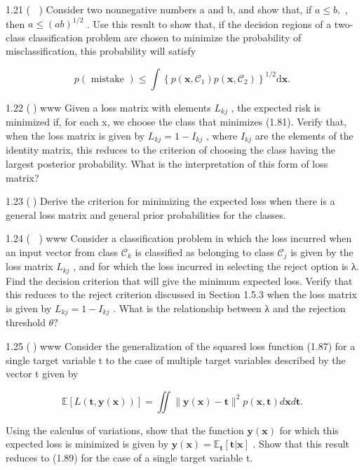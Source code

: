 \documentclass[
  10
]{article}
\begin{document}
1.21 ( ) Consider two nonnegative numbers a and b, and show that, if
\(a \leqslant b ,\) , then \(a \leqslant ( a b ) ^ { 1 / 2 }\) . Use
this result to show that, if the decision regions of a two-class
classification problem are chosen to minimize the probability of
misclassification, this probability will satisfy

\[
p (\text { mistake }) \leqslant \int \left\{p (\mathbf {x}, \mathcal {C} _ {1}) p (\mathbf {x}, \mathcal {C} _ {2}) \right\} ^ {1 / 2} \mathrm{d} \mathbf {x}.\tag{1.150}
\]

1.22 () www Given a loss matrix with elements \(L _ { k j }\) , the
expected risk is minimized if, for each x, we choose the class that
minimizes (1.81). Verify that, when the loss matrix is given by
\(L _ { k j } = 1 - I _ { k j }\) , where \(I _ { k j }\) are the
elements of the identity matrix, this reduces to the criterion of
choosing the class having the largest posterior probability. What is the
interpretation of this form of loss matrix?

1.23 () Derive the criterion for minimizing the expected loss when there
is a general loss matrix and general prior probabilities for the
classes.

1.24 ( ) www Consider a classification problem in which the loss
incurred when an input vector from class \(\mathcal { C } _ { k }\) is
classified as belonging to class \(\mathcal { C } _ { j }\) is given by
the loss matrix \(L _ { k j }\) , and for which the loss incurred in
selecting the reject option is λ. Find the decision criterion that will
give the minimum expected loss. Verify that this reduces to the reject
criterion discussed in Section 1.5.3 when the loss matrix is given by
\(L _ { k j } = 1 - I _ { k j }\) . What is the relationship between λ
and the rejection threshold \(\theta ?\)

1.25 () www Consider the generalization of the squared loss function
(1.87) for a single target variable t to the case of multiple target
variables described by the vector t given by

\[
\mathbb {E} [ L (\mathbf {t}, \mathbf {y} (\mathbf {x})) ] = \iint \| \mathbf {y} (\mathbf {x}) - \mathbf {t} \| ^ {2} p (\mathbf {x}, \mathbf {t}) d \mathbf {x} d \mathbf {t}.\tag{1.151}
\]

Using the calculus of variations, show that the function
\(\mathbf { y } ( \mathbf { x } )\) for which this expected loss is
minimized is given by
\(\mathbf { y } ( \mathbf { x } ) = \mathbb { E } _ { \mathbf { t } } [ \mathbf { t } | \mathbf { x } ]\)
. Show that this result reduces to (1.89) for the case of a single
target variable t.
\end{document}
